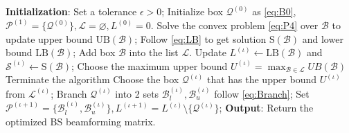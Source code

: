 \documentclass[runningheads]{llncs}
\begin{document}
\begin{algorithm}[htb]
\caption{Iterative BB Algorithm solving Problem \eqref{eq:P3}.}
\begin{algorithmic}[1]
\label{Alg:brb}
\STATE \textbf{Initialization}: 
\STATE Set a tolerance $\epsilon > 0$; 
\STATE Initialize box $\mathcal{Q}^{(0)}$ as \eqref{eq:B0}, $\mathcal{P}^{(1)} = \{\mathcal{Q}^{(0)}\}, \mathcal{L} = \varnothing, L^{(0)} = 0$. 
\STATE Solve the convex problem \eqref{eq:P4} over $\mathcal{B}$ to update upper bound $\mathrm{UB}(\mathcal{B})$;
\STATE Follow \eqref{eq:LB} to get solution $\mathrm{S}(\mathcal{B})$ and lower bound $\mathrm{LB}(\mathcal{B})$;
\STATE Add box $\mathcal{B}$ into the list $\mathcal{L}$.
\ENDIF 
{}
\STATE Update $L^{(\iota)} \leftarrow \mathrm{LB}(\mathcal{B})$ and $\mathcal{S}^{(\iota)} \leftarrow \mathrm{S}(\mathcal{B})$;
\ENDIF
\ENDFOR
\STATE Choose the maximum upper bound $U^{(\iota)} = \max_{\mathcal{B} \in \mathcal{L}} UB(\mathcal{B}) $
\STATE Terminate the algorithm
\ENDIF
{}
\STATE Choose the box $\mathcal{Q}^{(\iota)}$ that has the upper bound $U^{(\iota)}$ from $\mathcal{L}^{(\iota)}$;
\STATE Branch $\mathcal{Q}^{(\iota)}$ into 2 sets $\mathcal{B}_l^{(\iota)}, \mathcal{B}_u^{(\iota)}$ follow \eqref{eq:Branch}; 
\STATE Set $\mathcal{P}^{(\iota+1)} = \{\mathcal{B}_l^{(\iota)}, \mathcal{B}_u^{(\iota)} \}, L^{(\iota+1)} =  L^{(\iota)} \setminus \{ \mathcal{Q}^{(\iota)}\}$; 
\ENDFOR
\STATE \textbf{Output}:
Return the optimized BS beamforming matrix. 
\end{algorithmic}
\end{algorithm}
\end{document}

